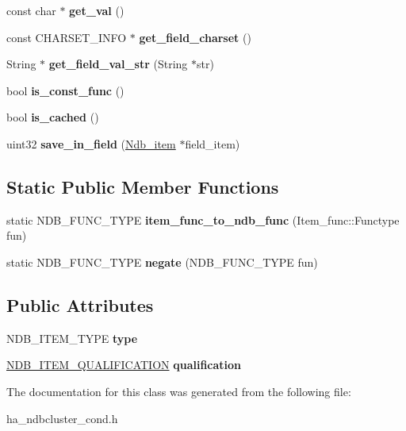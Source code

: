 \begin{DoxyCompactItemize}
const char $\ast$ {\bfseries get\+\_\+val} ()
\item 
\mbox{\label{classNdb__item_a34bc36beae8fb9d96129777db5397285}} 
const C\+H\+A\+R\+S\+E\+T\+\_\+\+I\+N\+FO $\ast$ {\bfseries get\+\_\+field\+\_\+charset} ()
\item 
\mbox{\label{classNdb__item_afaffed1d138ae51cee3b3a3315e6bef5}} 
String $\ast$ {\bfseries get\+\_\+field\+\_\+val\+\_\+str} (String $\ast$str)
\item 
\mbox{\label{classNdb__item_a558f71ca0ad6d51c38241d85311a56ef}} 
bool {\bfseries is\+\_\+const\+\_\+func} ()
\item 
\mbox{\label{classNdb__item_aa7f397b2c29e33bcfdb11d032e78008e}} 
bool {\bfseries is\+\_\+cached} ()
\item 
\mbox{\label{classNdb__item_aaeea43a1221c6267811418db65a3272f}} 
uint32 {\bfseries save\+\_\+in\+\_\+field} (\mbox{\hyperlink{classNdb__item}{Ndb\+\_\+item}} $\ast$field\+\_\+item)
\end{DoxyCompactItemize}
\subsection*{Static Public Member Functions}
\begin{DoxyCompactItemize}
\item 
\mbox{\label{classNdb__item_a8a182b21d757b98a93b6cba0c06ec575}} 
static N\+D\+B\+\_\+\+F\+U\+N\+C\+\_\+\+T\+Y\+PE {\bfseries item\+\_\+func\+\_\+to\+\_\+ndb\+\_\+func} (Item\+\_\+func\+::\+Functype fun)
\item 
\mbox{\label{classNdb__item_ac0af73bd5a2601728aa9f3f3bce62cd6}} 
static N\+D\+B\+\_\+\+F\+U\+N\+C\+\_\+\+T\+Y\+PE {\bfseries negate} (N\+D\+B\+\_\+\+F\+U\+N\+C\+\_\+\+T\+Y\+PE fun)
\end{DoxyCompactItemize}
\subsection*{Public Attributes}
\begin{DoxyCompactItemize}
\item 
\mbox{\label{classNdb__item_a11b812dd81da2bf2577fdb3d4e045977}} 
N\+D\+B\+\_\+\+I\+T\+E\+M\+\_\+\+T\+Y\+PE {\bfseries type}
\item 
\mbox{\label{classNdb__item_a015a60681ba7e664c9e197045ef8a0e4}} 
\mbox{\hyperlink{unionndb__item__qualification}{N\+D\+B\+\_\+\+I\+T\+E\+M\+\_\+\+Q\+U\+A\+L\+I\+F\+I\+C\+A\+T\+I\+ON}} {\bfseries qualification}
\end{DoxyCompactItemize}


The documentation for this class was generated from the following file\+:\begin{DoxyCompactItemize}
\item 
ha\+\_\+ndbcluster\+\_\+cond.\+h\end{DoxyCompactItemize}
